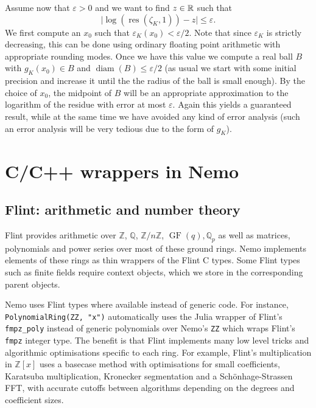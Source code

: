 \documentclass{sig-alternate-05-2015}
\begin{document}
Assume now that $\varepsilon > 0$ and we want to find $z \in \mathbb{R}$ such that
\[ \lvert \log(\operatorname{res}(\zeta_K, 1)) - z \rvert \leq \varepsilon.\]
We first compute an $x_0$ such that $\varepsilon_K(x_0) < \varepsilon/2$. Note that since $\varepsilon_K$ is strictly decreasing, this can be done using ordinary floating point arithmetic with appropriate rounding modes.
Once we have this value we compute a real ball $B$ with $g_K(x_0) \in B$ and $\operatorname{diam}(B) \leq \varepsilon/2$ (as usual we start with some initial precision and increase it until the the radius of the ball is small enough).
By the choice of $x_0$, the midpoint of $B$ will be an appropriate approximation to the logarithm of the residue with error at most $\varepsilon$.
Again this yields a guaranteed result, while at the same time we have avoided any kind of error analysis (such an error analysis will be very tedious due to the form of $g_K$).

\section{C/C++ wrappers in Nemo}

\subsection{Flint: arithmetic and number theory}

Flint provides arithmetic over
$\mathbb{Z}$, $\mathbb{Q}$, $\mathbb{Z}/n\mathbb{Z}$,
$\operatorname{GF}(q), \mathbb{Q}_p$
as well as matrices, polynomials and power series over most
of these ground rings.
Nemo implements elements of these rings as thin wrappers of the
Flint C types.
Some Flint types such as finite fields
require context objects, which we
store in the corresponding parent objects.

Nemo uses Flint types where available instead of generic code.
For instance, \texttt{PolynomialRing(ZZ, "x")} automatically uses
the Julia wrapper of Flint's \texttt{fmpz\_poly} instead of generic
polynomials over Nemo's \texttt{ZZ} which wraps Flint's \texttt{fmpz}
integer type.
The benefit is that
Flint implements many low level tricks and algorithmic optimisations
specific to each ring. For example, Flint's multiplication in $\mathbb{Z}[x]$
uses a basecase method with optimisations for small coefficients,
Karatsuba multiplication, Kronecker segmentation and
a Sch\"{o}nhage-Strassen FFT, with accurate cutoffs
between algorithms depending on the degrees and coefficient sizes.
\end{document}
